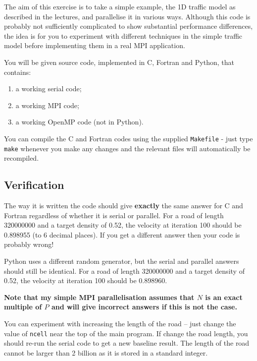 \documentclass{article}
\begin{document}
The aim of this exercise is to take a simple example, the 1D traffic
model as described in the lectures, and parallelise it in various
ways. Although this code is probably not sufficiently complicated to
show substantial performance differences, the idea is for you to
experiment with different techniques in the simple traffic model
before implementing them in a real MPI application.

You will be given source code, implemented in C, Fortran and Python, that
contains:

\begin{enumerate}

\item a working serial code;

\item a working MPI code;

\item a working OpenMP code (not in Python).

\end{enumerate}

You can compile the C and Fortran codes using the supplied
\texttt{Makefile} - just type \texttt{make} whenever you make any
changes and the relevant files will automatically be recompiled.

\subsection{Verification}

The way it is written the code should give {\bf exactly} the same
answer for C and Fortran regardless of whether it is serial or
parallel. For a road of length 320000000 and a target density of 0.52,
the velocity at iteration 100 should be 0.898955 (to 6 decimal
places). If you get a different answer then your code is probably
wrong!

Python uses a different random generator, but the serial and parallel
answers should still be identical. For a road of length 320000000 and
a target density of 0.52, the velocity at iteration 100 should be
0.898960.

{\bf Note that my simple MPI parallelisation assumes that $N$ is an exact
multiple of $P$ and will give incorrect answers if this is not the
case.}

You can experiment with increasing the length of the road -- just
change the value of {\verb+ncell+} near the top of the main program.
If change the road length, you should re-run the serial code to get a
new baseline result. The length of the road cannot be larger than 2
billion as it is stored in a standard integer.
\end{document}
